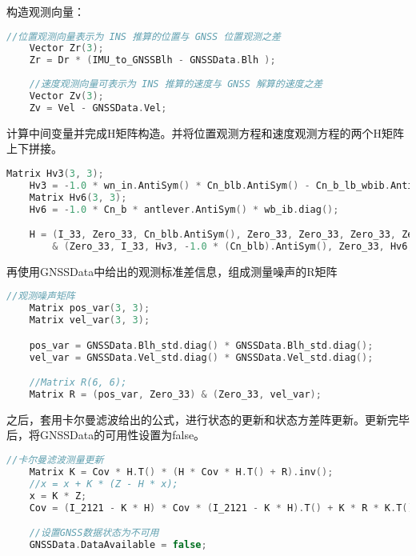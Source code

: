 \documentclass[codepkg=listings,theme=fancy]{course-report}
\begin{document}
构造观测向量：
\begin{lstlisting}[language=C++,emph={Matrix,ANGLE,Vector,IMUError,IMUDATA,IMUNoise,GNSSDATA,IMUBOX},emphstyle=\color{cyan}]
	//位置观测向量表示为 INS 推算的位置与 GNSS 位置观测之差
	Vector Zr(3);
	Zr = Dr * (IMU_to_GNSSBlh - GNSSData.Blh );
	
	//速度观测向量可表示为 INS 推算的速度与 GNSS 解算的速度之差
	Vector Zv(3);
	Zv = Vel - GNSSData.Vel;

\end{lstlisting}

计算中间变量并完成H矩阵构造。并将位置观测方程和速度观测方程的两个H矩阵上下拼接。
\begin{lstlisting}[language=C++,emph={Matrix,ANGLE,Vector,IMUError,IMUDATA,IMUNoise,GNSSDATA,IMUBOX},emphstyle=\color{cyan}]
	Matrix Hv3(3, 3);
	Hv3 = -1.0 * wn_in.AntiSym() * Cn_blb.AntiSym() - Cn_b_lb_wbib.AntiSymMatrix();
	Matrix Hv6(3, 3);
	Hv6 = -1.0 * Cn_b * antlever.AntiSym() * wb_ib.diag();

	H = (I_33, Zero_33, Cn_blb.AntiSym(), Zero_33, Zero_33, Zero_33, Zero_33)
		& (Zero_33, I_33, Hv3, -1.0 * (Cn_blb).AntiSym(), Zero_33, Hv6, Zero_33);

\end{lstlisting}

再使用GNSSData中给出的观测标准差信息，组成测量噪声的R矩阵
\begin{lstlisting}[language=C++,emph={Matrix,ANGLE,Vector,IMUError,IMUDATA,IMUNoise,GNSSDATA,IMUBOX},emphstyle=\color{cyan}]
	//观测噪声矩阵
	Matrix pos_var(3, 3);
	Matrix vel_var(3, 3);

	pos_var = GNSSData.Blh_std.diag() * GNSSData.Blh_std.diag();
	vel_var = GNSSData.Vel_std.diag() * GNSSData.Vel_std.diag();

	//Matrix R(6, 6);
	Matrix R = (pos_var, Zero_33) & (Zero_33, vel_var);

\end{lstlisting}

之后，套用卡尔曼滤波给出的公式，进行状态的更新和状态方差阵更新。更新完毕后，将GNSSData的可用性设置为false。
\begin{lstlisting}[language=C++,emph={Matrix,ANGLE,Vector,IMUError,IMUDATA,IMUNoise,GNSSDATA,IMUBOX},emphstyle=\color{cyan}]
	//卡尔曼滤波测量更新
	Matrix K = Cov * H.T() * (H * Cov * H.T() + R).inv();
	//x = x + K * (Z - H * x);
	x = K * Z;
	Cov = (I_2121 - K * H) * Cov * (I_2121 - K * H).T() + K * R * K.T();

	//设置GNSS数据状态为不可用
	GNSSData.DataAvailable = false;
\end{lstlisting}
\end{document}
